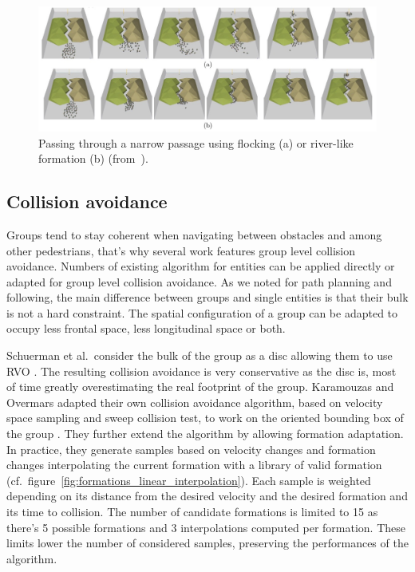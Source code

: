 \documentclass[a4paper,titlepage]{article}
\begin{document}
\begin{figure}[h]
\centering
\includegraphics[width=\textwidth]{NarrowPassage.jpg}
\caption{Passing through a narrow passage using flocking (a) or river-like formation (b) (from~\cite{Bayazit:2003up}).}
\label{fig:narrow_passage}
\end{figure} 

\subsection{Collision avoidance}
\label{sec:who_s_in_charge:collision_avoidance}

Groups tend to stay coherent when navigating between obstacles and among other pedestrians, that’s why several work features group level collision avoidance. Numbers of existing algorithm for entities can be applied directly or adapted for group level collision avoidance. As we noted for path planning and following, the main difference between groups and single entities is that their bulk is not a hard constraint. The spatial configuration of a group can be adapted to occupy less frontal space, less longitudinal space or both. 

Schuerman et al.\ consider the bulk of the group as a disc allowing them to use RVO \cite{Schuerman:2010um,vandenBerg:2008tu}. The resulting collision avoidance is very conservative as the disc is, most of time greatly overestimating the real footprint of the group. Karamouzas and Overmars adapted their own collision avoidance algorithm, based on velocity space sampling and sweep collision test, to work on the oriented bounding box of the group \cite{ko_vriphys10,Karamouzas:2010fi}. They further extend the algorithm by allowing formation adaptation. In practice, they generate samples based on velocity changes and formation changes interpolating the current formation with a library of valid formation (cf.\ figure~\ref{fig:formations_linear_interpolation}). Each sample is weighted depending on its distance from the desired velocity and the desired formation and its time to collision. The number of candidate formations is limited to 15 as there’s 5 possible formations and 3 interpolations computed per formation. These limits lower the number of considered samples, preserving the performances of the algorithm. 
\end{document}
